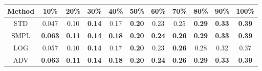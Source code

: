 \documentclass{standalone}
\begin{document}
\begin{tabular}{c|cccccccccc}
      \toprule
      Method & 10\% & 20\% & 30\% & 40\% & 50\% & 60\% & 70\% & 80\% & 90\% & 100\% \\
      \midrule
STD & 0.047 & 0.10 & \textbf{0.14} & 0.17 & \textbf{0.20} & 0.23 & 0.25 & \textbf{0.29} & \textbf{0.33} & \textbf{0.39}\\
SMPL & \textbf{0.063} & \textbf{0.11} & \textbf{0.14} & \textbf{0.18} & \textbf{0.20} & \textbf{0.24} & \textbf{0.26} & \textbf{0.29} & \textbf{0.33} & \textbf{0.39}\\
LOG & 0.057 & 0.10 & \textbf{0.14} & 0.17 & \textbf{0.20} & 0.23 & \textbf{0.26} & 0.28 & 0.32 & 0.37\\
ADV & \textbf{0.063} & \textbf{0.11} & \textbf{0.14} & \textbf{0.18} & \textbf{0.20} & \textbf{0.24} & \textbf{0.26} & \textbf{0.29} & \textbf{0.33} & \textbf{0.39}\\
  \bottomrule
\end{tabular}
\end{document}

